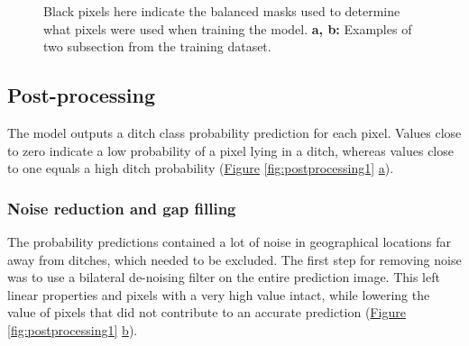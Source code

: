 \documentclass[]{interact}
\theoremstyle{plain}%
\theoremstyle{definition}
\theoremstyle{remark}
\begin{document}
\begin{figure} [!htb]
    \caption{Black pixels here indicate the balanced masks used to determine what pixels were used when training the model. \textbf{a, b: }Examples of two subsection from the training dataset.}
    \label{fig:balancedmasks}
\end{figure}

\subsection{Post-processing}
The model outputs a ditch class probability prediction for each pixel. Values close to zero indicate a low probability of a pixel lying in a ditch, whereas values close to one equals a high ditch probability (\hyperref[fig:postprocessing1]{Figure} \ref{fig:postprocessing1} \hyperref[fig:postprocessing1]{a}).

\subsubsection{Noise reduction and gap filling}
The probability predictions contained a lot of noise in geographical locations far away from ditches, which needed to be excluded. The first step for removing noise was to use a bilateral de-noising filter on the entire prediction image. This left linear properties and pixels with a very high value intact, while lowering the value of pixels that did not contribute to an accurate prediction (\hyperref[fig:postprocessing1]{Figure} \ref{fig:postprocessing1} \hyperref[fig:postprocessing1]{b}).
\end{document}
